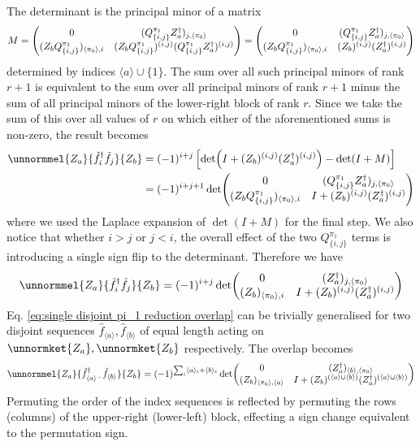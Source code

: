 \documentclass[12pt]{article}
\newcommand{\seq}[1]{\langle #1\rangle}
\newcommand{\hc}{^\dagger}
\begin{document}
	The determinant is the principal minor of a matrix
	\begin{equation}
	M = \mqty(0 & (Q^{\pi_1}_{\{i,j\}}Z_a\hc)_{j, \seq{\pi_0}}\\
		(Z_bQ^{\pi_1}_{\{i,j\}})_{\seq{\pi_0},i} & (Z_bQ^{\pi_1}_{\{i,j\}})^{(i,j)} (Q^{\pi_1}_{\{i,j\}}Z_a\hc)^{(i, j)}) = \mqty(0 & (Q^{\pi_1}_{\{i,j\}}Z_a\hc)_{j, \seq{\pi_0}}\\
		(Z_bQ^{\pi_1}_{\{i,j\}})_{\seq{\pi_0},i} & (Z_b)^{(i,j)} (Z_a\hc)^{(i, j)})
	\end{equation}
	determined by indices $\seq{a}\cup\{1\}$. The sum over all such principal minors of rank $r+1$ is equivalent to the sum over all principal minors of rank $r+1$ minus the sum of all principal minors of the lower-right block of rank $r$. Since we take the sum of this over all values of $r$ on which either of the aforementioned sums is non-zero, the result becomes
	\begin{align}
	\unnormmel{Z_a}{\hat{f}\hc_i\hat{f}_j}{Z_b} &= (-1)^{i+j}\left[\det(I+(Z_b)^{(i,j)} (Z_a\hc)^{(i, j)})-\det(I+M)\right]\nonumber\\
	&= (-1)^{i+j+1}\det(\mqty{
		0 & (Q^{\pi_1}_{\{i,j\}}Z_a\hc)_{j, \seq{\pi_0}}\\
		(Z_bQ^{\pi_1}_{\{i,j\}})_{\seq{\pi_0},i} & I+(Z_b)^{(i,j)} (Z_a\hc)^{(i, j)}
	})
	\end{align}
	where we used the Laplace expansion of $\det(I+M)$ for the final step. We also notice that whether $i>j$ or $j<i$, the overall effect of the two $Q^{\pi_1}_{\{i,j\}}$ terms is introducing a single sign flip to the determinant. Therefore we have
	\begin{equation} \label{eq:single disjoint pi_1 reduction overlap}
	\unnormmel{Z_a}{\hat{f}\hc_i\hat{f}_j}{Z_b} = (-1)^{i+j}\det(\mqty{
		0 & (Z_a\hc)_{j, \seq{\pi_0}}\\
		(Z_b)_{\seq{\pi_0},i} & I+(Z_b)^{(i,j)} (Z_a\hc)^{(i, j)}
	})
	\end{equation}
	Eq. \ref{eq:single disjoint pi_1 reduction overlap} can be trivially generalised for two disjoint sequences $\hat{f}_{\seq{a}},\hat{f}_{\seq{b}}$ of equal length acting on $\unnormket{Z_a},\unnormket{Z_b}$ respectively. The overlap becomes
	\begin{equation} \label{eq:disjoint pi_1 reduction overlap}
	\unnormmel{Z_a}{\hat{f}\hc_{\seq{a}^-}\hat{f}_{\seq{b}}}{Z_b} = (-1)^{\sum_i\seq{a}_i + \seq{b}_i}\det(\mqty{
		0 & (Z_a\hc)_{\seq{b}, \seq{\pi_0}}\\
		(Z_b)_{\seq{\pi_0},\seq{a}} & I+(Z_b)^{(\seq{a}\cup \seq{b})} (Z_a\hc)^{(\seq{a}\cup \seq{b})}
	})
	\end{equation}
	Permuting the order of the index sequences is reflected by permuting the rows (columns) of the upper-right (lower-left) block, effecting a sign change equivalent to the permutation sign.
	
\end{document}
